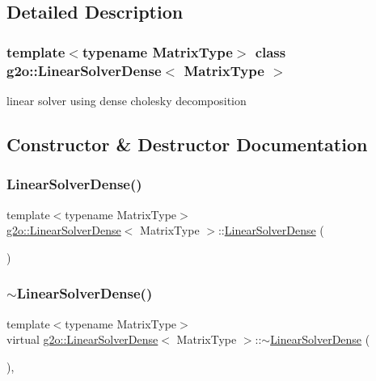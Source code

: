 \subsection{Detailed Description}
\subsubsection*{template$<$typename Matrix\+Type$>$\newline
class g2o\+::\+Linear\+Solver\+Dense$<$ Matrix\+Type $>$}

linear solver using dense cholesky decomposition 

\subsection{Constructor \& Destructor Documentation}
\mbox{\label{classg2o_1_1_linear_solver_dense_a25d8767ad60e944d8518348a136830da}} 
\subsubsection{\texorpdfstring{Linear\+Solver\+Dense()}{LinearSolverDense()}}
{\footnotesize\ttfamily template$<$typename Matrix\+Type$>$ \\
\mbox{\hyperlink{classg2o_1_1_linear_solver_dense}{g2o\+::\+Linear\+Solver\+Dense}}$<$ Matrix\+Type $>$\+::\mbox{\hyperlink{classg2o_1_1_linear_solver_dense}{Linear\+Solver\+Dense}} (\begin{DoxyParamCaption}{ }\end{DoxyParamCaption})\hspace{0.3cm}{\ttfamily [inline]}}

\mbox{\label{classg2o_1_1_linear_solver_dense_a2b3cbb77fa958bf322b98e38ec3e29c2}} 
\subsubsection{\texorpdfstring{$\sim$\+Linear\+Solver\+Dense()}{~LinearSolverDense()}}
{\footnotesize\ttfamily template$<$typename Matrix\+Type$>$ \\
virtual \mbox{\hyperlink{classg2o_1_1_linear_solver_dense}{g2o\+::\+Linear\+Solver\+Dense}}$<$ Matrix\+Type $>$\+::$\sim$\mbox{\hyperlink{classg2o_1_1_linear_solver_dense}{Linear\+Solver\+Dense}} (\begin{DoxyParamCaption}{ }\end{DoxyParamCaption})\hspace{0.3cm}{\ttfamily [inline]}, {\ttfamily [virtual]}}




